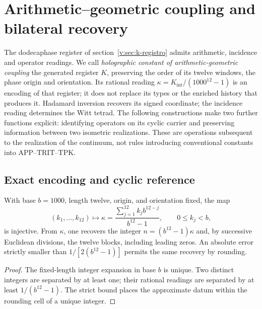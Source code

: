 \section{Arithmetic--geometric coupling and bilateral recovery}
\label{v:sec:acoplamiento-recuperacion}

The dodecaphase register of section~\ref{v:sec:k-registro} admits
arithmetic, incidence and operator readings. We call
\emph{holographic constant of arithmetic-geometric coupling}
the generated register \(K\), preserving the order of its twelve windows,
the phase origin and orientation. Its rational reading
\(\kappa=K_{\mathrm{int}}/(1000^{12}-1)\) is an encoding of that
register; it does not replace its types or the enriched history that produces it.
Hadamard inversion recovers its signed coordinate; the incidence
reading determines the Witt tetrad. The following constructions
make two further functions explicit: identifying operators on its cyclic
carrier and preserving information between two isometric realizations.
These are operations subsequent to the realization of the continuum, not rules
introducing conventional constants into APP--TRIT--TPK.

\subsection{Exact encoding and cyclic reference}
\label{v:subsec:acoplamiento-codigo}

\begin{proposition}
With base \(b=1000\), length twelve, origin, and orientation fixed, the map
\[
 (k_1,\ldots,k_{12})\longmapsto
 \kappa=\frac{\sum_{j=1}^{12}k_jb^{12-j}}{b^{12}-1},
 \qquad 0\leq k_j<b,
\]
is injective. From \(\kappa\), one recovers the integer
\(n=(b^{12}-1)\kappa\) and, by successive Euclidean divisions, the twelve
blocks, including leading zeros. An absolute error strictly
smaller than \(1/[2(b^{12}-1)]\) permits the same recovery by rounding.
\end{proposition}
\begin{proof}
The fixed-length integer expansion in base \(b\) is unique. Two distinct
integers are separated by at least one; their rational readings
are separated by at least \(1/(b^{12}-1)\). The strict bound places
the approximate datum within the rounding cell of a unique integer.
\end{proof}


